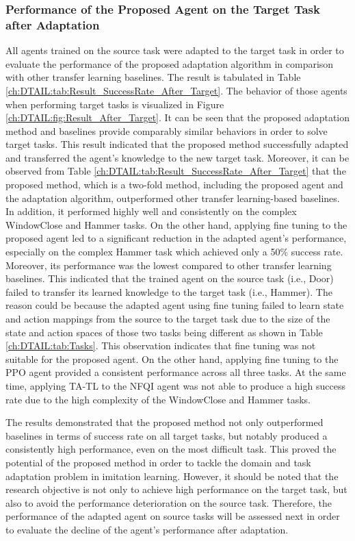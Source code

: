 \subsubsection{Performance of the Proposed Agent on the Target Task after Adaptation}
All agents trained on the source task were adapted to the target task in order to evaluate the performance of the proposed adaptation algorithm in comparison with other transfer learning baselines.
The result is tabulated in Table \ref{ch:DTAIL:tab:Result_SuccessRate_After_Target}.
The behavior of those agents when performing target tasks is visualized in Figure \ref{ch:DTAIL:fig:Result_After_Target}.
It can be seen that the proposed adaptation method and baselines provide comparably similar behaviors in order to solve target tasks.
This result indicated that the proposed method successfully adapted and transferred the agent's knowledge to the new target task.
Moreover, it can be observed from Table \ref{ch:DTAIL:tab:Result_SuccessRate_After_Target} that the proposed method, which is a two-fold method, including the proposed agent and the adaptation algorithm, outperformed other transfer learning-based baselines.
In addition, it performed highly well and consistently on the complex WindowClose and Hammer tasks.
On the other hand,
applying fine tuning to the proposed agent led to a significant reduction in the adapted agent's performance, especially on the complex Hammer task which achieved only a 50\% success rate.
Moreover,
its performance was the lowest compared to other transfer learning baselines.
This indicated that the trained agent on the source task (i.e., Door) failed to transfer its learned knowledge to the target task (i.e., Hammer).
The reason could
be because the adapted agent using fine tuning failed to learn state and action mappings from the source to the target task due to the size of the state and action spaces of those two tasks being different as shown in Table \ref{ch:DTAIL:tab:Tasks}.
This observation indicates that fine tuning was not suitable for the proposed agent.
On the other hand,
applying fine tuning to the PPO agent provided a consistent performance across all three tasks.
At the same time, applying TA-TL to the NFQI agent was not able to produce a high success rate due to the high complexity of the WindowClose and Hammer tasks.


The results demonstrated that the proposed method not only outperformed baselines in terms of success rate on all target tasks, but notably produced a consistently high performance, even on the most difficult task.
This proved the potential of the proposed method in order to tackle the domain and task adaptation problem in imitation learning.
However,
it should be noted that the research objective is not only to achieve high performance on the target task, but also to avoid the performance deterioration on the source task.
Therefore,
the performance of the adapted agent on source tasks will be assessed next in order to evaluate the decline of the agent's performance after adaptation.


